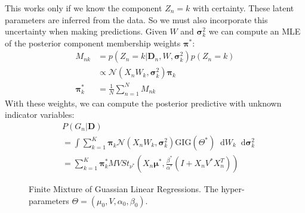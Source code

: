 \documentclass[10pt]{proc}
\newcommand*\diff{\mathop{}\!\mathrm{d}}
\begin{document}
This works only if we know the component $Z_n = k$ with certainty. These
latent parameters are inferred from the data. So we must also incorporate this
uncertainty when making predictions. Given $W$ and $\bm{\sigma}_k^2$ we can
compute an MLE of the posterior component membership weights $\bm{\pi}^*$:
%
\begin{align}
    M_{nk} &= p(Z_n = k | \bm{D}_n, W, \bm{\sigma}_k^2) p(Z_n = k)    \\
           &\propto \mathcal{N}(X_n W_k, \bm{\sigma}_k^2) \bm{\pi}_k  \\
    \bm{\pi}_k^* &= \frac{1}{N} \sum_{n=1}^N M_{nk}
\end{align}
%
With these weights, we can compute the posterior predictive with unknown
indicator variables:
%
\begin{align}
    &P(G_n | \bm{D})  \nonumber \\
     &= \int \sum_{k=1}^K \bm{\pi}_k
            \mathcal{N}(X_n W_k, \bm{\sigma}_k^2)
                 \text{GIG}(\Theta^*)
                 \diff W_k \diff \bm{\sigma}_k^2 \\
     &= \sum_{k=1}^K \bm{\pi}_k^*
            MVSt_{\nu^*} \left(
                X_n \bm{\mu^*},
                \frac{\beta^*}{\alpha^*}(I + X_n V^* X_n^T)
        \right)
\end{align}

\begin{figure}[tbh]
  \setlength{\belowcaptionskip}{15pt plus 3pt minus 2pt}
  \centering
  \caption{Finite Mixture of Guassian Linear Regressions. The hyper-parameters
           $\Theta = (\mu_0, V, \alpha_0, \beta_0)$. }
  \label{fig:mglr-pgm}
\end{figure}
\end{document}
